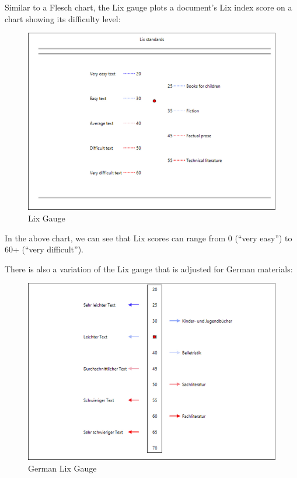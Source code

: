 \documentclass[
]{book}
\theoremstyle{definition}
\theoremstyle{definition}
\theoremstyle{definition}
\theoremstyle{definition}
\theoremstyle{remark}
\begin{document}
Similar to a Flesch chart, the Lix gauge plots a document's Lix index score on a chart showing its difficulty level:

\begin{figure}[H]

{\centering \includegraphics[width=0.75\linewidth,]{Images/LixGauge} 

}

\caption{Lix Gauge}\label{fig:lixGuage2}
\end{figure}

In the above chart, we can see that Lix scores can range from 0 (``very easy'') to 60+ (``very difficult'').

There is also a variation of the Lix gauge that is adjusted for German materials:

\begin{figure}[H]

{\centering \includegraphics[width=0.75\linewidth,]{Images/GermanLixGauge} 

}

\caption{German Lix Gauge}\label{fig:germanLixGauge}
\end{figure}
\end{document}
